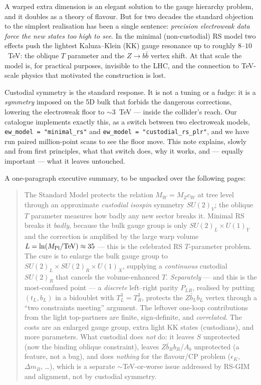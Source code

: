 \documentclass[11pt]{article}
\newcommand{\cw}{c_W}
\newcommand{\SUL}{SU(2)_L}
\newcommand{\SUR}{SU(2)_R}
\newcommand{\UX}{U(1)_X}
\newcommand{\PLR}{P_{LR}}
\newcommand{\code}[1]{\texttt{#1}}
\theoremstyle{definition}
\begin{document}
A warped extra dimension is an elegant solution to the gauge hierarchy problem,
and it doubles as a theory of flavour. But for two decades the standard
objection to the simplest realisation has been a single sentence: \emph{precision
electroweak data force the new states too high to see}. In the minimal
(non-custodial) RS model two effects push the lightest Kaluza--Klein (KK) gauge
resonance up to roughly $8$--$10$~TeV: the oblique $T$ parameter and the
$Z\to b\bar b$ vertex shift. At that scale the model is, for practical purposes,
invisible to the LHC, and the connection to TeV-scale physics that motivated the
construction is lost.

Custodial symmetry is the standard response. It is not a tuning or a fudge: it
is a \emph{symmetry} imposed on the 5D bulk that forbids the dangerous
corrections, lowering the electroweak floor to $\sim 3$~TeV --- inside the
collider's reach. Our catalogue implements exactly this, as a switch
between two electroweak models, \code{ew\_model = "minimal\_rs"} and
\code{ew\_model = "custodial\_rs\_plr"}, and we have run paired
million-point scans to see the floor move. This note explains, slowly and from
first principles, what that switch does, why it works, and --- equally important
--- what it leaves untouched.

A one-paragraph executive summary, to be unpacked over the following pages:

\begin{quote}
\small
The Standard Model protects the relation $M_W = M_Z\cw$ at tree level through an
approximate \emph{custodial isospin} symmetry $SU(2)_V$; the oblique $T$
parameter measures how badly any new sector breaks it. Minimal RS breaks it
\emph{badly}, because the bulk gauge group is only $\SUL\times U(1)_Y$ and the
correction is amplified by the large warp volume $L=\ln(M_{\rm Pl}/{\rm
TeV})\approx 35$ --- this is the celebrated RS $T$-parameter problem. The cure is
to enlarge the bulk gauge group to $\SUL\times\SUR\times\UX$, supplying a
\emph{continuous} custodial $\SUR$ that cancels the volume-enhanced $T$.
\emph{Separately} --- and this is the most-confused point --- a \emph{discrete}
left--right parity $\PLR$, realised by putting $(t_L,b_L)$ in a bidoublet with
$T^3_L=T^3_R$, protects the $Z\bar b_L b_L$ vertex through a ``two constraints
meeting'' argument. The leftover one-loop contributions from the light
top-partners are finite, sign-definite, and \emph{correlated}. The costs are an
enlarged gauge group, extra light KK states (custodians), and more parameters.
What custodial does \emph{not} do: it leaves $S$ unprotected (now the binding
oblique constraint), leaves $Z\bar b_R b_R$/$A_b$ unprotected (a feature, not a
bug), and does \emph{nothing} for the flavour/CP problem
($\epsilon_K$, $\Delta m_{B}$, \dots), which is a separate $\sim$TeV-or-worse
issue addressed by RS-GIM and alignment, not by custodial symmetry.
\end{quote}
\end{document}
